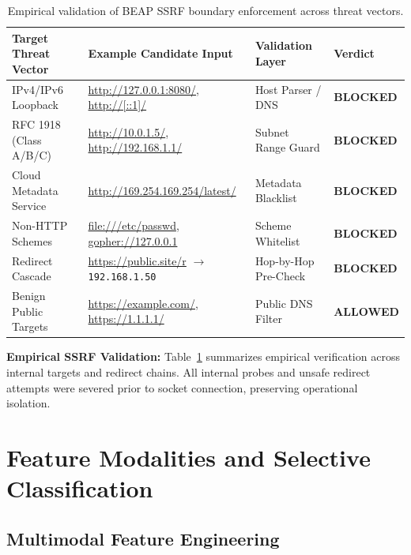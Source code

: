 \documentclass{llncs}
\begin{document}
\begin{table}[t]
\caption{Empirical validation of BEAP SSRF boundary enforcement across threat vectors.}
\label{tab:ssrf}
\centering
\setlength{\tabcolsep}{5pt}
\renewcommand{\arraystretch}{0.92}
\begin{tabular}{llll}
\toprule
\textbf{Target Threat Vector} & \textbf{Example Candidate Input} & \textbf{Validation Layer} & \textbf{Verdict} \\
\midrule
IPv4/IPv6 Loopback & \url{http://127.0.0.1:8080/}, \url{http://[::1]/} & Host Parser / DNS & \textbf{BLOCKED} \\
RFC 1918 (Class A/B/C) & \url{http://10.0.1.5/}, \url{http://192.168.1.1/} & Subnet Range Guard & \textbf{BLOCKED} \\
Cloud Metadata Service & \url{http://169.254.169.254/latest/} & Metadata Blacklist & \textbf{BLOCKED} \\
Non-HTTP Schemes & \url{file:///etc/passwd}, \url{gopher://127.0.0.1} & Scheme Whitelist & \textbf{BLOCKED} \\
Redirect Cascade & \url{https://public.site/r} $\to$ \texttt{192.168.1.50} & Hop-by-Hop Pre-Check & \textbf{BLOCKED} \\
Benign Public Targets & \url{https://example.com/}, \url{https://1.1.1.1/} & Public DNS Filter & \textbf{ALLOWED} \\
\bottomrule
\end{tabular}
\end{table}

\textbf{Empirical SSRF Validation:} Table~\ref{tab:ssrf} summarizes empirical verification across internal targets and redirect chains. All internal probes and unsafe redirect attempts were severed prior to socket connection, preserving operational isolation.

\section{Feature Modalities and Selective Classification}

\subsection{Multimodal Feature Engineering}
\end{document}
